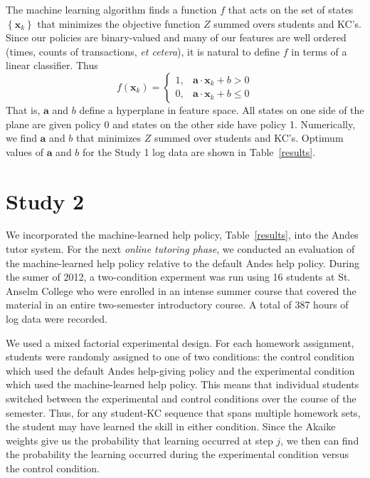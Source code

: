 \documentclass{edm_template}
\begin{document}
The machine learning algorithm finds a function $f$ that acts on
the set of states $\left\{\mathbf{x}_k\right\}$ that minimizes
the objective function $Z$ summed overs students and KC's.  
Since our policies are binary-valued
and many of our features are well ordered (times, counts of transactions,
{\em et cetera}), it is natural to define $f$ in terms of a 
linear classifier.  Thus
%
\begin{equation}
              f(\mathbf{x}_k) = \left\{\begin{array}{cc}
		1,& \mathbf{a}\cdot \mathbf{x}_k+b >0 \\
                0, & \mathbf{a}\cdot \mathbf{x}_k +b\le 0
		\end{array} \right. \label{classifier}
\end{equation}
%
That is, $\mathbf{a}$ and $b$ define a hyperplane in feature
space.  All states on one side of the plane are given policy 0
and states on the other side have policy 1.
Numerically, we find $\mathbf{a}$ and $b$ that minimizes $Z$
summed over students and KC's.
Optimum values of  $\mathbf{a}$ and $b$ for the  
Study 1 log data are shown in Table~\ref{results}.

\section{Study 2}

We incorporated the machine-learned help policy,
Table~\ref{results}, into the Andes tutor system.  For the next {\em
  online tutoring phase}, we conducted an evaluation of the
machine-learned help policy relative to the default Andes help policy.
During the sumer of 2012, a two-condition experment was run using 16
students at St. Anselm College who were enrolled in an intense summer
course that covered the material in an entire two-semester introductory course. 
A total of 387 hours of log data were recorded.

We used a mixed factorial experimental design.  For each homework assignment,
students were randomly assigned to one of two conditions:  the control
condition which used the default Andes help-giving policy and the
experimental condition which used the machine-learned help policy.
This means that individual students switched
between the experimental and control conditions over the course of the
semester.  Thus, for any student-KC sequence that spans multiple
homework sets, the student may have learned the skill in either 
condition.  Since the Akaike weights  give us the probability that 
learning occurred at step $j$, we then can find the probability 
the learning occurred
during the experimental condition versus the control condition.
\end{document}
